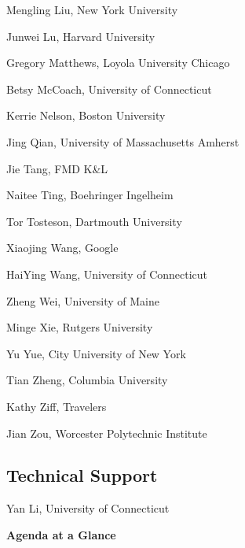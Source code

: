 \documentclass[10pt]{article}
\begin{document}
{Mengling Liu, New York University

Junwei Lu, Harvard University

Gregory Matthews, Loyola University Chicago

Betsy McCoach, University of Connecticut

Kerrie Nelson, Boston University

Jing Qian, University of Massachusetts Amherst

Jie Tang, FMD K\&L

Naitee Ting, Boehringer Ingelheim

Tor Tosteson, Dartmouth University

Xiaojing Wang, Google

HaiYing Wang, University of Connecticut

Zheng Wei, University of Maine

Minge Xie, Rutgers University

Yu Yue, City University of New York

Tian Zheng, Columbia University

Kathy Ziff, Travelers

Jian Zou, Worcester Polytechnic Institute

\subsection*{Technical Support}

Yan Li, University of Connecticut
}

\clearpage

\onecolumn

\begin{center}
  {\bf\Huge Agenda at a Glance}
\end{center}
\end{document}
